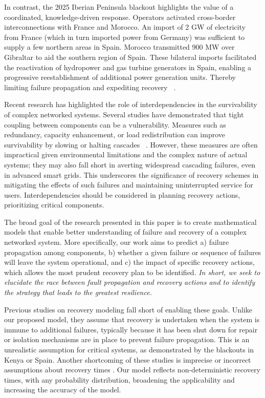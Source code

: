 \documentclass[conference]{IEEEtran}
\begin{document}
In contrast, the 2025 Iberian Peninsula blackout highlights the value of a coordinated, knowledge-driven response. Operators activated cross-border interconnections with France and Morocco. An import of 2 GW of electricity from France (which in turn imported power from Germany) was sufficient to supply a few northern areas in Spain. Morocco transmitted 900 MW over Gibraltar to aid the southern region of Spain. These bilateral imports facilitated the reactivation of hydropower and gas turbine generators in Spain, enabling a progressive reestablishment of additional power generation units. Thereby limiting failure propagation and expediting recovery ~\cite{cetinkaya_technical_2025}. 

Recent research has highlighted the role of interdependencies in the survivability of complex networked systems. Several studies have demonstrated that tight coupling between components can be a vulnerability. Measures such as redundancy, capacity enhancement, or load redistribution can improve survivability by slowing or halting cascades ~\cite{zhang_effects_2017}. However, these measures are often impractical given environmental limitations and the complex nature of actual systems; they may also fall short in averting widespread cascading failures, even in advanced smart grids. This underscores the significance of recovery schemes in mitigating the effects of such failures and maintaining uninterrupted service for users. Interdependencies should be considered in planning recovery actions, prioritizing critical components.

The broad goal of the research presented in this paper is to create mathematical models that enable better understanding of failure and recovery of a complex networked system. More specifically, our work aims to predict a) failure propagation among components, b) whether a given failure or sequence of failures will leave the system operational, and c) the impact of specific recovery actions, which allows the most prudent recovery plan to be identified. \emph{In short, we seek to elucidate the race between fault propagation and recovery actions and to identify the strategy that leads to the greatest resilience.}

Previous studies on recovery modeling fall short of enabling these goals. Unlike our proposed model, they assume that recovery is undertaken when the system is immune to additional failures, typically because it has been shut down for repair or isolation mechanisms are in place to prevent failure propagation. This is an unrealistic assumption for critical systems, as demonstrated by the blackouts in Kenya or Spain. Another shortcoming of these studies is imprecise or incorrect assumptions about recovery times \cite{sarkale_solving_2018, biswas_repair_2025}.
Our model reflects non-deterministic recovery times, with any probability distribution, broadening the applicability and increasing the accuracy of the model. 
\end{document}
